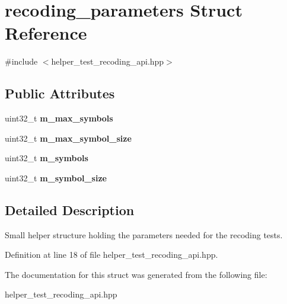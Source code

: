 \hypertarget{structrecoding__parameters}{\section{recoding\-\_\-parameters Struct Reference}
\label{structrecoding__parameters}
}


{\ttfamily \#include $<$helper\-\_\-test\-\_\-recoding\-\_\-api.\-hpp$>$}

\subsection*{Public Attributes}
\begin{DoxyCompactItemize}
\item 
\hypertarget{structrecoding__parameters_a1f92540ee7d30dcdc856325da01668c0}{uint32\-\_\-t {\bfseries m\-\_\-max\-\_\-symbols}}\label{structrecoding__parameters_a1f92540ee7d30dcdc856325da01668c0}

\item 
\hypertarget{structrecoding__parameters_a3c79bf0b235961c0f3c04c460b99a4c1}{uint32\-\_\-t {\bfseries m\-\_\-max\-\_\-symbol\-\_\-size}}\label{structrecoding__parameters_a3c79bf0b235961c0f3c04c460b99a4c1}

\item 
\hypertarget{structrecoding__parameters_a95ef45922889d1135854b7d801c1cb3e}{uint32\-\_\-t {\bfseries m\-\_\-symbols}}\label{structrecoding__parameters_a95ef45922889d1135854b7d801c1cb3e}

\item 
\hypertarget{structrecoding__parameters_acfc24d7cc5c0b64a8aa4164022c58114}{uint32\-\_\-t {\bfseries m\-\_\-symbol\-\_\-size}}\label{structrecoding__parameters_acfc24d7cc5c0b64a8aa4164022c58114}

\end{DoxyCompactItemize}


\subsection{Detailed Description}
Small helper structure holding the parameters needed for the recoding tests. 

Definition at line 18 of file helper\-\_\-test\-\_\-recoding\-\_\-api.\-hpp.



The documentation for this struct was generated from the following file\-:\begin{DoxyCompactItemize}
\item 
helper\-\_\-test\-\_\-recoding\-\_\-api.\-hpp\end{DoxyCompactItemize}
